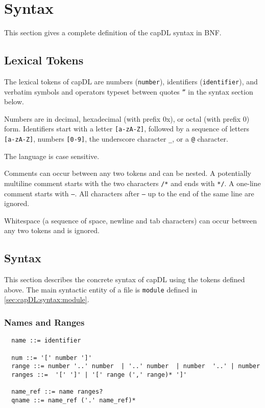 \documentclass[a4paper,11pt]{article}
\begin{document}
\section{Syntax}
\label{sec:capDL:syntax}

This section gives a complete definition of the capDL syntax in BNF.

\subsection{Lexical Tokens}

The lexical tokens of capDL are numbers (\texttt{number}), identifiers
(\texttt{identifier}), and verbatim symbols and operators typeset between
quotes \texttt{''} in the syntax section below.

Numbers are in decimal, hexadecimal (with prefix 0x), or octal (with prefix 0)
form. Identifiers start with a letter \texttt{[a-zA-Z]}, followed by a
sequence of letters \texttt{[a-zA-Z]}, numbers \texttt{[0-9]}, the
underscore character \texttt{\_}, or a \texttt{@} character.

The language is case sensitive.

Comments can occur between any two tokens and can be nested. A potentially
multiline comment starts with the two characters \texttt{/*} and ends with
\texttt{*/}. A one-line comment starts with \texttt{--}. All characters after
\texttt{--} up to the end of the same line are ignored.

Whitespace (a sequence of space, newline and tab characters) can occur between
any two tokens and is ignored.


\subsection{Syntax}

This section describes the concrete syntax of capDL using the tokens defined above. The main syntactic entity of a file is \texttt{module} defined in \ref{sec:capDL:syntax:module}.

\subsubsection{Names and Ranges}

\begin{verbatim}
  name ::= identifier

  num ::= '[' number ']'
  range ::= number '..' number  | '..' number  | number  '..' | number            
  ranges ::=  '[' ']' | '[' range (',' range)* ']' 

  name_ref ::= name ranges?
  qname ::= name_ref ('.' name_ref)* 
\end{verbatim}
\end{document}
